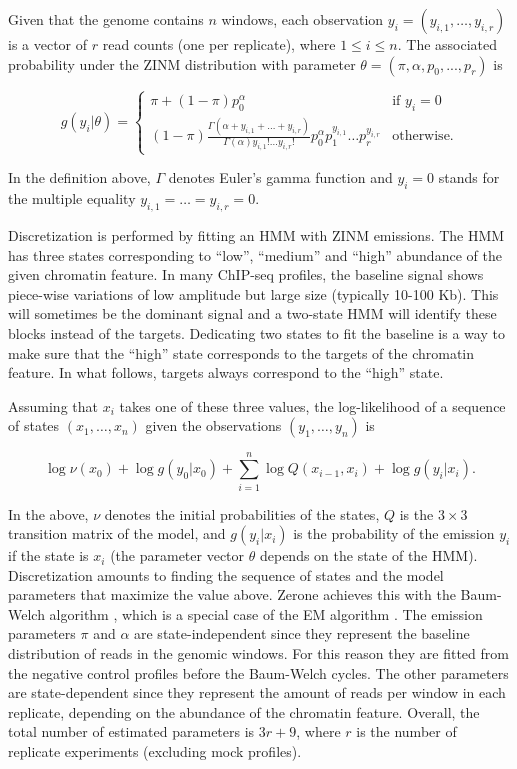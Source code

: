 \documentclass{bioinfo}
\begin{document}
\begin{methods}
Given that the genome contains $n$ windows, each observation
$y_i = (y_{i,1}, \ldots, y_{i,r})$ is a vector of $r$ read counts
(one per replicate), where $1 \leq i \leq n$. The associated probability
under the ZINM distribution with parameter
$\theta = (\pi, \alpha, p_0, ..., p_r)$ is

$$
g(y_i|\theta) = \left\{
\begin{array}{ll}
\pi + (1-\pi)p_0^{\alpha}
         & \mbox{if } y_i = 0 \\
(1-\pi )\frac{\Gamma(\alpha + y_{i,1} + \ldots + y_{i,r})}
  {\Gamma(\alpha)y_{i,1}! \ldots y_{i,r}!}
p_0^{\alpha} p_1^{y_{i,1}} \ldots p_r^{y_{i,r}}
         & \mbox{otherwise.}
\end{array}
\right.
$$

In the definition above, $\Gamma$ denotes Euler's gamma function and
$y_i = 0$ stands for the multiple equality $y_{i,1} = \ldots = y_{i,r} = 0$.

Discretization is performed by fitting an HMM
with ZINM emissions. The HMM has three
states corresponding to ``low'', ``medium'' and ``high'' abundance of
the given chromatin feature. In many ChIP-seq
profiles, the baseline signal shows piece-wise variations of low amplitude
but large size (typically 10-100 Kb). This will sometimes be the dominant
signal and a two-state HMM will identify these blocks instead of the
targets. Dedicating two states to fit the baseline is a way to make sure
that the ``high'' state corresponds to the targets of the chromatin
feature. In what follows, targets always correspond to
the ``high'' state.

Assuming that $x_i$ takes one of these three values, the log-likelihood of
a sequence of states $(x_1, \ldots, x_n)$ given the observations
$(y_1, \ldots, y_n)$ is

$$
\log \nu(x_0) + \log g(y_0|x_0) +
   \sum_{i=1}^n \log Q(x_{i-1},x_i) + \log g(y_i|x_i).
$$

In the above, $\nu$ denotes the initial probabilities of the states,
$Q$ is the $3 \times 3$ transition matrix of the model, and
$g(y_i|x_i)$ is the probability of the emission $y_i$ if the state is
$x_i$ (the parameter vector $\theta$ depends on the state of the HMM).
Discretization amounts to finding the sequence of states and the
model parameters that maximize the value above. Zerone achieves this
with the Baum-Welch algorithm \citep{baum1966}, which is a special case
of the EM algorithm \citep{Dempster77maximumlikelihood}. The emission
parameters $\pi$ and $\alpha$ are state-independent since they represent
the baseline distribution of reads in the genomic windows. For this
reason they are fitted from the negative control profiles before the
Baum-Welch cycles. The other parameters are state-dependent since they
represent the amount of reads per window in each replicate, depending
on the abundance of the chromatin feature. Overall, the
total number of estimated parameters is $3r+9$, where $r$ is the
number of replicate experiments (excluding mock profiles).


\end{methods}
\end{document}
